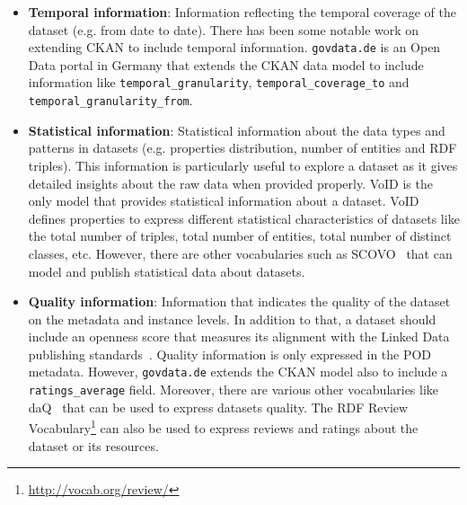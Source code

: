 \begin{itemize}
 \item \textbf{Temporal information}: Information reflecting the temporal coverage of the dataset (e.g. from date to date). There has been some notable work on extending CKAN to include temporal information. \texttt{govdata.de} is an Open Data portal in Germany that extends the CKAN data model to include information like \texttt{temporal\_granularity}, \texttt{temporal\_coverage\_to} and \texttt{temporal\_granularity\_from}.
 \item \textbf{Statistical information}: Statistical information about the data types and patterns in datasets (e.g. properties distribution, number of entities and RDF triples). This information is particularly useful to explore a dataset as it gives detailed insights about the raw data when provided properly. VoID is the only model that provides statistical information about a dataset. VoID defines properties to express different statistical characteristics of datasets like the total number of triples, total number of entities, total number of distinct classes, etc. However, there are other vocabularies such as SCOVO~\cite{Hausenblas:ESWC:09} that can model and publish statistical data about datasets.
 \item \textbf{Quality information}: Information that indicates the quality of the dataset on the metadata and instance levels. In addition to that, a dataset should include an openness score that measures its alignment with the Linked Data publishing standards~\cite{Berners-Lee:W3C:06}. Quality information is only expressed in the POD metadata. However, \texttt{govdata.de} extends the CKAN model also to include a \texttt{ratings\_average} field. Moreover, there are various other vocabularies like daQ~\cite{Debattista:WWW:14} that can be used to express datasets quality. The RDF Review Vocabulary\footnote{\url{http://vocab.org/review/}} can also be used to express reviews and ratings about the dataset or its resources.
\end{itemize}


